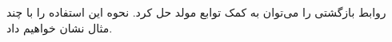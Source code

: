 \p
روابط بازگشتی را می‌توان به کمک توابع مولد حل کرد.
نحوه این استفاده را با چند مثال نشان خواهیم داد.



